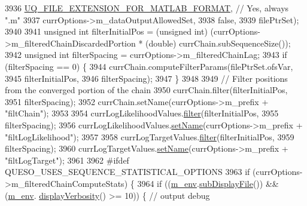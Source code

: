 \begin{DoxyCode}
3936                          \hyperlink{_defines_8h_ac440026eff7deb1c1eed1eea0e8e36ba}{UQ\_FILE\_EXTENSION\_FOR\_MATLAB\_FORMAT}, \textcolor{comment}{// Yes,
       always ".m"}
3937                          currOptions->m\_dataOutputAllowedSet,
3938                          \textcolor{keyword}{false},
3939                          filePtrSet);
3940 
3941     \textcolor{keywordtype}{unsigned} \textcolor{keywordtype}{int} filterInitialPos = (\textcolor{keywordtype}{unsigned} int) (currOptions->m\_filteredChainDiscardedPortion * (\textcolor{keywordtype}{double})
       currChain.subSequenceSize());
3942     \textcolor{keywordtype}{unsigned} \textcolor{keywordtype}{int} filterSpacing    = currOptions->m\_filteredChainLag;
3943     \textcolor{keywordflow}{if} (filterSpacing == 0) \{
3944       currChain.computeFilterParams(filePtrSet.ofsVar,
3945                                     filterInitialPos,
3946                                     filterSpacing);
3947     \}
3948 
3949     \textcolor{comment}{// Filter positions from the converged portion of the chain}
3950     currChain.filter(filterInitialPos,
3951                      filterSpacing);
3952     currChain.setName(currOptions->m\_prefix + \textcolor{stringliteral}{"filtChain"});
3953 
3954     currLogLikelihoodValues.\hyperlink{class_q_u_e_s_o_1_1_scalar_sequence_aaf386a04a0cebd7f88c5b7694a5fd3d1}{filter}(filterInitialPos,
3955                                    filterSpacing);
3956     currLogLikelihoodValues.\hyperlink{class_q_u_e_s_o_1_1_scalar_sequence_a198b72423333bc5aa1722b830b64a263}{setName}(currOptions->m\_prefix + \textcolor{stringliteral}{"filtLogLikelihood"});
3957 
3958     currLogTargetValues.\hyperlink{class_q_u_e_s_o_1_1_scalar_sequence_aaf386a04a0cebd7f88c5b7694a5fd3d1}{filter}(filterInitialPos,
3959                                filterSpacing);
3960     currLogTargetValues.\hyperlink{class_q_u_e_s_o_1_1_scalar_sequence_a198b72423333bc5aa1722b830b64a263}{setName}(currOptions->m\_prefix + \textcolor{stringliteral}{"filtLogTarget"});
3961 
3962 \textcolor{preprocessor}{#ifdef QUESO\_USES\_SEQUENCE\_STATISTICAL\_OPTIONS}
3963 \textcolor{preprocessor}{}    \textcolor{keywordflow}{if} (currOptions->m\_filteredChainComputeStats) \{
3964       \textcolor{keywordflow}{if} ((\hyperlink{class_q_u_e_s_o_1_1_m_l_sampling_a13f1ca4fe9f94822fe572a743eaced1d}{m\_env}.\hyperlink{class_q_u_e_s_o_1_1_base_environment_a8a0064746ae8dddfece4229b9ad374d6}{subDisplayFile}()) && (\hyperlink{class_q_u_e_s_o_1_1_m_l_sampling_a13f1ca4fe9f94822fe572a743eaced1d}{m\_env}.
      \hyperlink{class_q_u_e_s_o_1_1_base_environment_a1fe5f244fc0316a0ab3e37463f108b96}{displayVerbosity}() >= 10)) \{ \textcolor{comment}{// output debug}

\end{DoxyCode}
